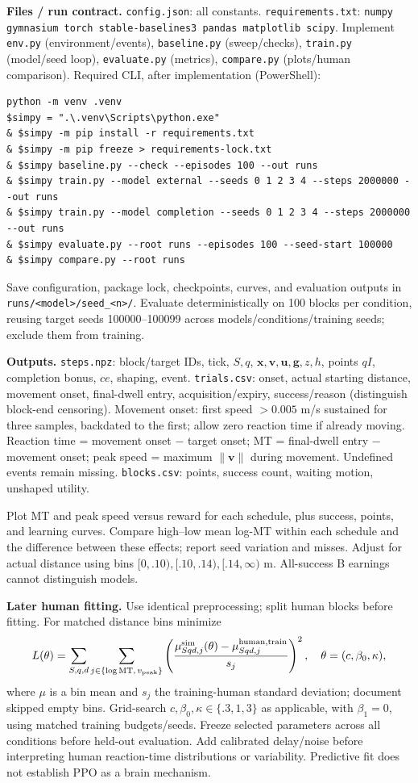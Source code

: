 \documentclass[10pt,letterpaper]{article}
\begin{document}
\textbf{Files / run contract.} \texttt{config.json}: all constants. \texttt{requirements.txt}: \texttt{numpy gymnasium torch stable-baselines3 pandas matplotlib scipy}. Implement \texttt{env.py} (environment/events), \texttt{baseline.py} (sweep/checks), \texttt{train.py} (model/seed loop), \texttt{evaluate.py} (metrics), \texttt{compare.py} (plots/human comparison). Required CLI, after implementation (PowerShell):
\begin{lstlisting}
python -m venv .venv
$simpy = ".\.venv\Scripts\python.exe"
& $simpy -m pip install -r requirements.txt
& $simpy -m pip freeze > requirements-lock.txt
& $simpy baseline.py --check --episodes 100 --out runs
& $simpy train.py --model external --seeds 0 1 2 3 4 --steps 2000000 --out runs
& $simpy train.py --model completion --seeds 0 1 2 3 4 --steps 2000000 --out runs
& $simpy evaluate.py --root runs --episodes 100 --seed-start 100000
& $simpy compare.py --root runs
\end{lstlisting}
Save configuration, package lock, checkpoints, curves, and evaluation outputs in \texttt{runs/<model>/seed\_<n>/}. Evaluate deterministically on 100 blocks per condition, reusing target seeds 100000--100099 across models/conditions/training seeds; exclude them from training.

\textbf{Outputs.} \texttt{steps.npz}: block/target IDs, tick, $S,q$, $\mathbf x,\mathbf v,\mathbf u,\mathbf g,z,h$, points $qI$, completion bonus, $ce$, shaping, event. \texttt{trials.csv}: onset, actual starting distance, movement onset, final-dwell entry, acquisition/expiry, success/reason (distinguish block-end censoring). Movement onset: first speed $>0.005$ m/s sustained for three samples, backdated to the first; allow zero reaction time if already moving. Reaction time = movement onset $-$ target onset; MT = final-dwell entry $-$ movement onset; peak speed = maximum $\|\mathbf v\|$ during movement. Undefined events remain missing. \texttt{blocks.csv}: points, success count, waiting motion, unshaped utility.

Plot MT and peak speed versus reward for each schedule, plus success, points, and learning curves. Compare high--low mean log-MT within each schedule and the difference between these effects; report seed variation and misses. Adjust for actual distance using bins $[0,.10),[.10,.14),[.14,\infty)$ m. All-success B earnings cannot distinguish models.

\textbf{Later human fitting.} Use identical preprocessing; split human blocks before fitting. For matched distance bins minimize
\[
L(\theta)=\sum_{S,q,d}\sum_{j\in\{\log\mathrm{MT},\,v_{\rm peak}\}}
\left(\frac{\mu^{\rm sim}_{Sqd,j}(\theta)-\mu^{\rm human,train}_{Sqd,j}}{s_j}\right)^2,
\quad \theta=(c,\beta_0,\kappa),
\]
where $\mu$ is a bin mean and $s_j$ the training-human standard deviation; document skipped empty bins. Grid-search $c,\beta_0,\kappa\in\{.3,1,3\}$ as applicable, with $\beta_1=0$, using matched training budgets/seeds. Freeze selected parameters across all conditions before held-out evaluation. Add calibrated delay/noise before interpreting human reaction-time distributions or variability. Predictive fit does not establish PPO as a brain mechanism.
\end{document}
